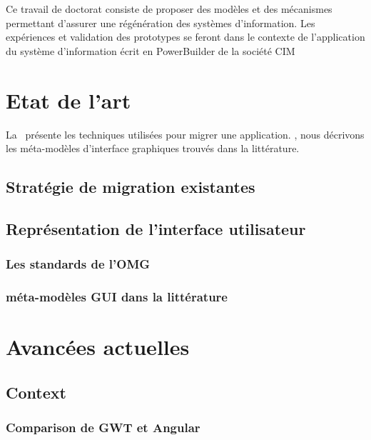 \documentclass[a4paper]{article}
\begin{document}
Ce travail de doctorat consiste de proposer des modèles et des mécanismes permettant d'assurer
une régénération des systèmes d'information. Les expériences et validation des prototypes se feront dans le contexte de l'application du système d'information écrit en PowerBuilder de la société CIM
\section{Etat de l'art}
\label{sec:stateOfTheArt}

La~ présente les techniques utilisées pour migrer une application.
, nous décrivons les méta-modèles d'interface graphiques trouvés dans la littérature.

\subsection{Stratégie de migration existantes}
\label{sec:migrationTechnique}

\subsection{Représentation de l'interface utilisateur}
\label{sec:position}

\subsubsection{Les standards de l'OMG}
\label{sec:omg}

\subsubsection{méta-modèles GUI dans la littérature}
\label{sec:stateMetaUI}

\section{Avancées actuelles}


\subsection{Context}
\label{sec:context}

\subsubsection{Comparison de GWT et Angular}
\label{sec:comparisonGwtAngular}
\end{document}
